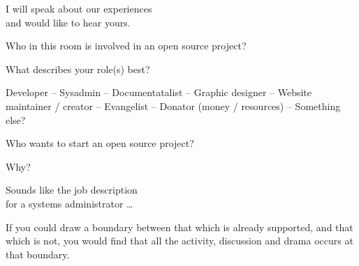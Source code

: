 \documentclass[t,handout,aspectratio=169]{beamer}
\begin{document}
\begin{frame}[standout]
    I will speak about our experiences \\
    and would like to hear yours.
\end{frame}

\begin{frame}[standout]
    Who in this room is involved in an open source project?
\end{frame}

\begin{frame}[standout]
    What describes your role(s) best?
\end{frame}

\begin{frame}[standout]
    Developer -- Sysadmin -- Documentatalist -- Graphic designer -- Website maintainer / creator -- Evangelist -- Donator (money / resources) -- Something else?
\end{frame}

\begin{frame}[standout]
    Who wants to start an open source project?
\end{frame}

\begin{frame}[standout]
    Why?
\end{frame}

\begin{frame}[fragile] %
    \vfill
       
\end{frame}

\begin{frame}[fragile] %
    \vfill
     
\end{frame}

\begin{frame}[standout]
    Sounds like the job description \\ for a systems administrator \ldots
\end{frame}

\begin{frame}[fragile] %
    \vfill
    If you could draw a boundary between that which is already supported, and that which is not, \pause you would find that all the activity, discussion and drama occurs at that boundary.
\end{frame}
\end{document}
